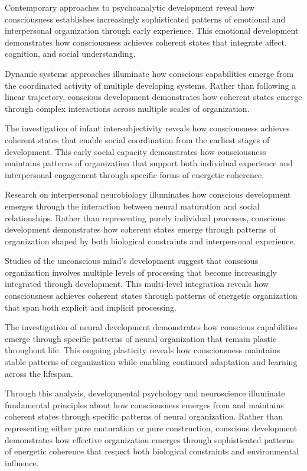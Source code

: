 Contemporary approaches to psychoanalytic development \cite{Stern2000} reveal how consciousness establishes increasingly sophisticated patterns of emotional and interpersonal organization through early experience. This emotional development demonstrates how consciousness achieves coherent states that integrate affect, cognition, and social understanding.

Dynamic systems approaches \cite{Thelen1996} illuminate how conscious capabilities emerge from the coordinated activity of multiple developing systems. Rather than following a linear trajectory, conscious development demonstrates how coherent states emerge through complex interactions across multiple scales of organization.

The investigation of infant intersubjectivity \cite{Trevarthen2011} reveals how consciousness achieves coherent states that enable social coordination from the earliest stages of development. This early social capacity demonstrates how consciousness maintains patterns of organization that support both individual experience and interpersonal engagement through specific forms of energetic coherence.

Research on interpersonal neurobiology \cite{Siegel2020} illuminates how conscious development emerges through the interaction between neural maturation and social relationships. Rather than representing purely individual processes, conscious development demonstrates how coherent states emerge through patterns of organization shaped by both biological constraints and interpersonal experience.

Studies of the unconscious mind's development \cite{Schore2019} suggest that conscious organization involves multiple levels of processing that become increasingly integrated through development. This multi-level integration reveals how consciousness achieves coherent states through patterns of energetic organization that span both explicit and implicit processing.

The investigation of neural development \cite{Quartz2002} demonstrates how conscious capabilities emerge through specific patterns of neural organization that remain plastic throughout life. This ongoing plasticity reveals how consciousness maintains stable patterns of organization while enabling continued adaptation and learning across the lifespan.

Through this analysis, developmental psychology and neuroscience illuminate fundamental principles about how consciousness emerges from and maintains coherent states through specific patterns of neural organization. Rather than representing either pure maturation or pure construction, conscious development demonstrates how effective organization emerges through sophisticated patterns of energetic coherence that respect both biological constraints and environmental influence.

